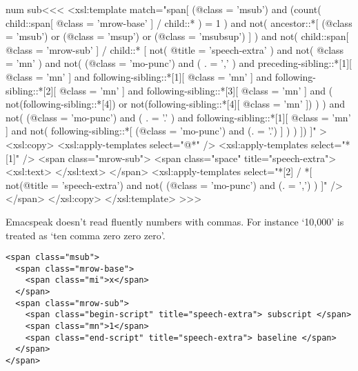 \documentclass{article}
\begin{document}
\<num sub\><<<
<xsl:template match="span[
    (@class = 'msub')
  and
    (count( child::span[ @class = 'mrow-base' ] 
           / child::* ) = 1 )
  and not( ancestor::*[
      (@class = 'msub')
    or
      (@class = 'msup')
    or
      (@class = 'msubsup')
    ] )
  and
    not( child::span[ @class = 'mrow-sub' ] 
           / child::* [
                not( @title = 'speech-extra' )
              and
                not( @class = 'mn' )
              and
                not( 
                  (@class = 'mo-punc')
                  and
                  ( . = ',' )
                  and
                  preceding-sibling::*[1][ @class = 'mn' ]
                  and
                  following-sibling::*[1][ @class = 'mn' ]
                  and
                  following-sibling::*[2][ @class = 'mn' ]
                  and
                  following-sibling::*[3][ @class = 'mn' ]
                  and
                  (  not(following-sibling::*[4])
                     or
                     not(following-sibling::*[4][ @class = 'mn' ])
                  )
                )
              and
                not( 
                  (@class = 'mo-punc')
                  and
                  ( . = '.' )
                  and
                  following-sibling::*[1][ @class = 'mn' ]
                  and
                  not(
                    following-sibling::*[ 
                       (@class = 'mo-punc')
                     and
                       (. = '.')
                    ]
                  )
                )
          ]) 
]" >
  <xsl:copy>
     <xsl:apply-templates select="@*" />     
     <xsl:apply-templates select="*[1]" />
     <span class="mrow-sub">
        <span class="space" title="speech-extra">
           <xsl:text> </xsl:text> 
        </span>
        <xsl:apply-templates
           select="*[2] / *[ 
                    not(@title = 'speech-extra')  
                 and
                    not(
                      (@class = 'mo-punc')
                      and (. = ',')
                    )  
          ]" />
     </span>
  </xsl:copy>
</xsl:template> 
>>>

Emacspeak doesn't read fluently numbers with commas. For instance `10,000' is 
treated as `ten comma zero zero zero'.

\begin{verbatim}
<span class="msub">
  <span class="mrow-base">
    <span class="mi">x</span>
  </span>
  <span class="mrow-sub">
    <span class="begin-script" title="speech-extra"> subscript </span>
    <span class="mn">1</span>
    <span class="end-script" title="speech-extra"> baseline </span>
  </span>
</span>
\end{verbatim}
\end{document}
